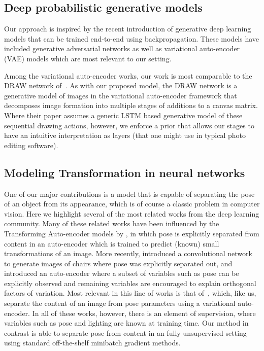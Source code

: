 \label{sec:related}
\vspace{-2mm}

\subsection{Deep probabilistic generative models}
\vspace{-2mm}
Our approach is inspired by the recent introduction of generative deep learning models that can be
trained end-to-end using backpropagation.  These models have included
generative adversarial networks \citep{denton2015deep, goodfellow2014generative}
as well as variational auto-encoder (VAE) models \citep{Kingma2014,kingma2014semi,rezende2014stochastic,burda2015importance}
which are most relevant to our setting.  

Among the variational auto-encoder works, our work is most comparable to 
the DRAW network of~\cite{gregor2015draw}.  As with our proposed model, 
the DRAW network is a generative model of images in the variational auto-encoder framework
that decomposes image formation into multiple stages of additions to a canvas matrix.  
Where their paper assumes a generic LSTM based generative model of these sequential 
drawing actions, however, we enforce a prior that allows our stages to have an intuitive interpretation
as layers (that one might use in typical photo editing software).


\vspace{-2mm}
\subsection{Modeling Transformation in neural networks}\vspace{-2mm}
One of our major contributions is a model that is capable of separating the pose of an object from its appearance,
which is of course a classic problem in computer vision.
Here we highlight several of the most related works from 
the deep learning community.  
Many of these  related works have been influenced by the Transforming Auto-encoder models by \cite{hinton2011transforming},
in which pose is explicitly separated from content in an auto-encoder which is trained to predict (known)
small transformations of an image.
More recently,  \cite{dosovitskiy2014learning} introduced a convolutional network to generate images of chairs where pose was explicitly separated out, and \cite{cheung2014discovering} introduced an auto-encoder where a subset of variables such as pose can be explicitly observed and remaining
variables are encouraged to explain orthogonal factors of variation.   
Most relevant in this line of works is that of~\cite{kulkarni2015deep}, which, like us, 
separate the content of an image from pose parameters using a variational auto-encoder.
In all of these works, however, there is an element of supervision, where variables such as pose
and lighting are known at training time. 
Our method in contrast is able to separate pose from content in an fully unsupervised setting 
using standard off-the-shelf minibatch gradient methods.




